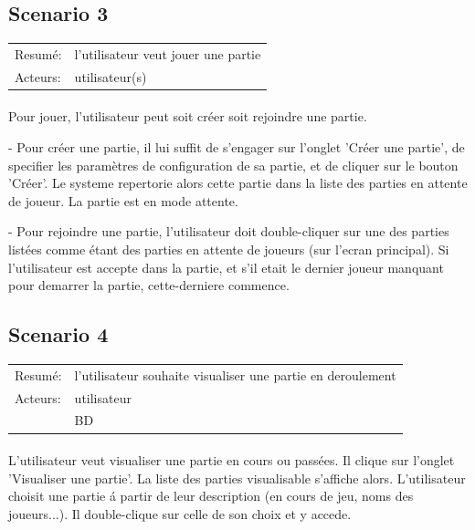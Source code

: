 \documentclass[french,12pt]{report}
\begin{document}
\subsection*{Scenario 3}

\begin{tabular}{ll}
  Resum\'e: & l'utilisateur veut jouer une partie\\
  Acteurs: & utilisateur(s)
\end{tabular}

\paragraph{}  

  Pour jouer, l'utilisateur peut soit cr\'eer soit rejoindre une partie.

  - Pour cr\'eer une partie, il lui suffit de s'engager sur l'onglet 
'Cr\'eer une partie', de specifier les param\`etres de configuration de sa 
partie, et de cliquer sur le bouton 'Cr\'eer'.
  Le systeme repertorie alors cette partie dans la liste des parties en 
attente de joueur. La partie est en mode attente.

  - Pour rejoindre une partie, l'utilisateur doit double-cliquer sur une 
des parties list\'ees comme \'etant des parties en attente de joueurs 
(sur l'ecran principal).
  Si l'utilisateur est accepte dans la partie, et s'il etait le dernier 
joueur manquant pour demarrer la partie, cette-derniere commence.



\subsection*{Scenario 4}

\begin{tabular}{ll}
  Resum\'e: & l'utilisateur souhaite visualiser une partie en deroulement \\
  Acteurs: & utilisateur \\
	   & BD
\end{tabular}

\paragraph{}
  L'utilisateur veut visualiser une partie en cours ou pass\'ees. 
  Il clique sur l'onglet 'Visualiser une partie'. La liste des parties 
  visualisable s'affiche alors. L'utilisateur choisit une partie \'a partir 
  de leur description (en cours de jeu, noms des joueurs...). 
  Il double-clique sur celle de son choix et y accede.
\end{document}

